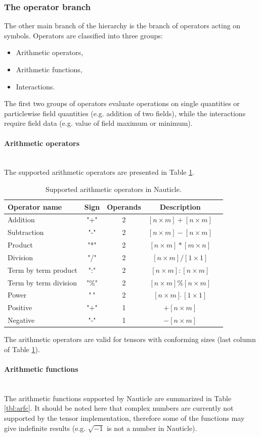 \documentclass[a4paper,12pt,openany]{book}
\newcommand{\myparagraph}[1]{\paragraph{#1}\mbox{}\\\noindent}
\theoremstyle{break}
\begin{document}
\subsubsection{The operator branch}
The other main branch of the hierarchy is the branch of operators acting on symbols. Operators are classified into three groups:
\begin{itemize}
  \item Arithmetic operators,
  \item Arithmetic functions,
  \item Interactions.
\end{itemize}
The first two groups of operators evaluate operations on single quantities or particlewise field quantities (e.g. addition of two fields), while the interactions require field data (e.g. value of field maximum or minimum).
\myparagraph{Arithmetic operators}
The supported arithmetic operators are presented in Table \ref{tbl:arop}.
\begin{table} [hbt!]
\begin{center}
\caption{Supported arithmetic operators in Nauticle.}\label{tbl:arop}
\begin{tabular}{ l c c c c }
\toprule[1.5pt]
\bf Operator name & \bf Sign & \bf Operands & \bf Description\\ 
\midrule
Addition & "+" & 2 & $[n \times m] + [n \times m]$\\ 
Subtraction & "-" & 2 & $[n \times m] - [n \times m]$\\ 
Product & "*" & 2 & $[n \times m] * [m \times n]$\\ 
Division & "/" & 2 & $[n \times m] / [1 \times 1]$\\ 
Term by term product & ":" & 2 & $[n \times m] : [n \times m]$\\ 
Term by term division & "\%" & 2 & $[n \times m] \% [n \times m]$\\ 
Power & "$\hat{\ }$" & 2 & $[n \times m] \hat{\ } [1 \times 1]$\\ 
Positive & "+" & 1 & $+[n \times m]$\\ 
Negative & "-" & 1 & $-[n \times m]$\\ 
\bottomrule[1.25pt]
\end{tabular}
\end{center}
\end{table}
The arithmetic operators are valid for tensors with conforming sizes (last column of Table \ref{tbl:arop}).
\myparagraph{Arithmetic functions} \label{sec:functions}
The arithmetic functions supported by Nauticle are summarized in Table \ref{tbl:arfc}. It should be noted here that complex numbers are currently not supported by the tensor implementation, therefore some of the functions may give indefinite results (e.g. $\sqrt{-1}$ is not a number in Nauticle).
\end{document}
